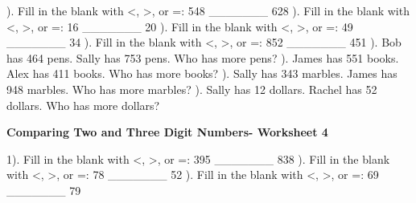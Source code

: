 \documentclass{article}%
\begin{document}
). Fill in the blank with <, >, or =: 548 \_\_\_\_\_\_\_ 628%
\newline%
\newline%
). Fill in the blank with <, >, or =: 16 \_\_\_\_\_\_\_ 20%
\newline%
\newline%
). Fill in the blank with <, >, or =: 49 \_\_\_\_\_\_\_ 34%
\newline%
\newline%
). Fill in the blank with <, >, or =: 852 \_\_\_\_\_\_\_ 451%
\newline%
\newline%
). Bob has 464 pens. Sally has 753 pens. Who has more pens?%
\newline%
\newline%
). James has 551 books. Alex has 411 books. Who has more books?%
\newline%
\newline%
). Sally has 343 marbles. James has 948 marbles. Who has more marbles?%
\newline%
\newline%
). Sally has 12 dollars. Rachel has 52 dollars. Who has more dollars?%
\newline%
\newline%
\newline%
\pagebreak%
\large%
\begin{center}%
\textbf{Comparing Two and Three Digit Numbers- Worksheet 4}%
\newline%
\newline%
\newline%
\end{center} \normalsize%
1). Fill in the blank with <, >, or =: 395 \_\_\_\_\_\_\_ 838%
\newline%
\newline%
). Fill in the blank with <, >, or =: 78 \_\_\_\_\_\_\_ 52%
\newline%
\newline%
). Fill in the blank with <, >, or =: 69 \_\_\_\_\_\_\_ 79%
\end{document}
